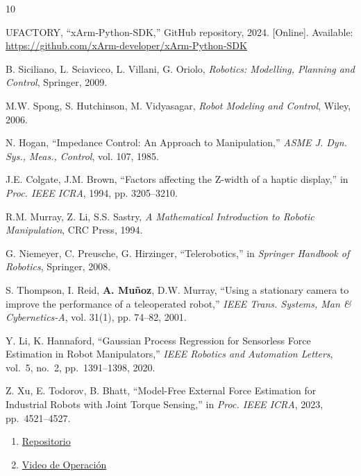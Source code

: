 \documentclass[journal,10pt,twoside]{IEEEtran}
\begin{document}
\begin{thebibliography}{10}

  UFACTORY, ``xArm-Python-SDK,''
  GitHub repository, 2024.
  [Online]. Available: \url{https://github.com/xArm-developer/xArm-Python-SDK}

  B. Siciliano, L. Sciavicco, L. Villani, G. Oriolo,
  \textit{Robotics: Modelling, Planning and Control},
  Springer, 2009.

  M.W. Spong, S. Hutchinson, M. Vidyasagar,
  \textit{Robot Modeling and Control},
  Wiley, 2006.

  N. Hogan,
  ``Impedance Control: An Approach to Manipulation,''
  \textit{ASME J. Dyn. Sys., Meas., Control},
  vol. 107, 1985.

  J.E. Colgate, J.M. Brown,
  ``Factors affecting the Z-width of a haptic display,''
  in \textit{Proc. IEEE ICRA}, 1994, pp. 3205--3210.

  R.M. Murray, Z. Li, S.S. Sastry,
  \textit{A Mathematical Introduction to Robotic Manipulation},
  CRC Press, 1994.

  G. Niemeyer, C. Preusche, G. Hirzinger,
  ``Telerobotics,''
  in \textit{Springer Handbook of Robotics},
  Springer, 2008.

  S. Thompson, I. Reid, \textbf{A. Muñoz}, D.W. Murray,
  ``Using a stationary camera to improve the performance
  of a teleoperated robot,''
  \textit{IEEE Trans. Systems, Man \& Cybernetics-A},
  vol. 31(1), pp. 74--82, 2001.

  Y. Li, K. Hannaford,
  ``Gaussian Process Regression for Sensorless Force Estimation
  in Robot Manipulators,''
  \textit{IEEE Robotics and Automation Letters},
  vol.~5, no.~2, pp.~1391--1398, 2020.

  Z. Xu, E. Todorov, B. Bhatt,
  ``Model-Free External Force Estimation for Industrial Robots
  with Joint Torque Sensing,''
  in \textit{Proc. IEEE ICRA}, 2023, pp.~4521--4527.

\end{thebibliography}

\appendix
\begin{enumerate}
    \item \href{https://github.com/htovarm7/Challenge-Kinematics}{Repositorio}
    \item \href{https://drive.google.com/file/d/1Ls7qgf7zE6q2LGQ2m7VvNVV79_FiToDb/view?usp=sharing}{Video de Operación}
\end{enumerate}
\end{document}
